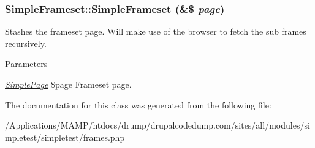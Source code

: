 \hypertarget{class_simple_frameset_ac573bfba76183db88c24c6208795e4b9}{
\subsubsection[{SimpleFrameset}]{\setlength{\rightskip}{0pt plus 5cm}SimpleFrameset::SimpleFrameset (\&\$ {\em page})}}
\label{class_simple_frameset_ac573bfba76183db88c24c6208795e4b9}
Stashes the frameset page. Will make use of the browser to fetch the sub frames recursively. 
\begin{DoxyParams}{Parameters}
\item[{\em \hyperlink{class_simple_page}{SimplePage}}]\$page Frameset page. \end{DoxyParams}


The documentation for this class was generated from the following file:\begin{DoxyCompactItemize}
\item 
/Applications/MAMP/htdocs/drump/drupalcodedump.com/sites/all/modules/simpletest/simpletest/frames.php\end{DoxyCompactItemize}
